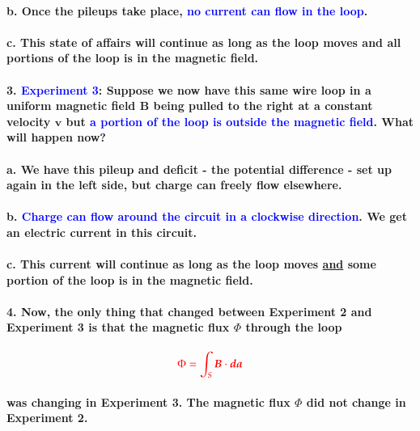 \documentclass{article}
\begin{document}
\paragraph{\indent b. Once the pileups take place, \textcolor{blue}{no current can flow in the loop}.}
\paragraph{\indent c. This state of affairs will continue as long as the loop moves and all portions of the loop is in the magnetic field.}
\paragraph{3. \textcolor{blue}{Experiment 3}: Suppose we now have this same wire loop in a uniform magnetic field $\boldsymbol{B}$ being pulled to the right at a constant velocity $\boldsymbol{v}$ but \textcolor{blue}{a portion of the loop is outside the magnetic field}. What will happen now?}
\paragraph{\indent a. We have this pileup and deficit - the potential difference - set up again in the left side, but charge can freely flow elsewhere.}
\paragraph{\indent b. \textcolor{blue}{Charge can flow around the circuit in a clockwise direction}. We get an electric current in this circuit.}
\paragraph{\indent c. This current will continue as long as the loop moves \underline{and} some portion of the loop is in the magnetic field.}
\paragraph{4. Now, the only thing that changed between Experiment 2 and Experiment 3 is that the magnetic flux $\Phi$ through the loop}
\begin{equation*}
    \textcolor{red}{\Phi=\int_S\boldsymbol{B}\cdot\boldsymbol{da}}
\end{equation*}
\paragraph{\indent was changing in Experiment 3. The magnetic flux $\Phi$ did not change in Experiment 2.}
\end{document}
